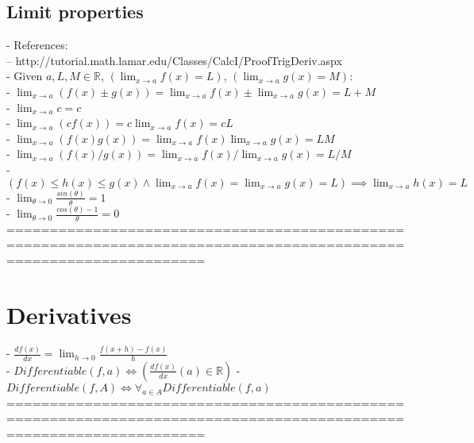 \documentclass{book}
\begin{document}
\subsection{Limit properties}
	- References: \\
		-- http://tutorial.math.lamar.edu/Classes/CalcI/ProofTrigDeriv.aspx \\
	- Given $a, L, M \in \mathbb{R}$, $(\lim_{x \to a} f(x) = L)$, $(\lim_{x \to a} g(x) = M)$: \\
	- $\lim_{x \to a} (f(x) \pm g(x)) = \lim_{x \to a} f(x) \pm \lim_{x \to a} g(x) = L + M$ \\ %
	- $\lim_{x \to a} c = c$ \\ %
	- $\lim_{x \to a} (c f(x)) = c \lim_{x \to a} f(x) = c L$ \\ %
	- $\lim_{x \to a} (f(x) g(x)) = \lim_{x \to a} f(x) \lim_{x \to a} g(x) = L M$ \\ %
	- $\lim_{x \to a} (f(x) / g(x)) = \lim_{x \to a} f(x) / \lim_{x \to a} g(x) = L / M$ \\ %
	- $(f(x) \leq h(x) \leq g(x) \land \lim_{x \to a} f(x) = \lim_{x \to a} g(x) = L) \implies \lim_{x \to a} h(x) = L$ \\
	- $\lim_{\theta \to 0} \frac{sin(\theta)}{\theta} = 1$ \\
	- $\lim_{\theta \to 0} \frac{cos(\theta) - 1}{\theta} = 0$ \\	
	===================================================================================================================
\section{Derivatives}
	- $\frac{df(x)}{dx} = \lim_{h \rightarrow 0} \frac{f(x+h) - f(x)}{h}$ \\
	- $Differentiable(f, a) \iff (\frac{df(x)}{dx}(a) \in \mathbb{R})$
	- $Differentiable(f, A) \iff \forall_{a \in A} Differentiable(f, a)$ \\
	===================================================================================================================
\end{document}
